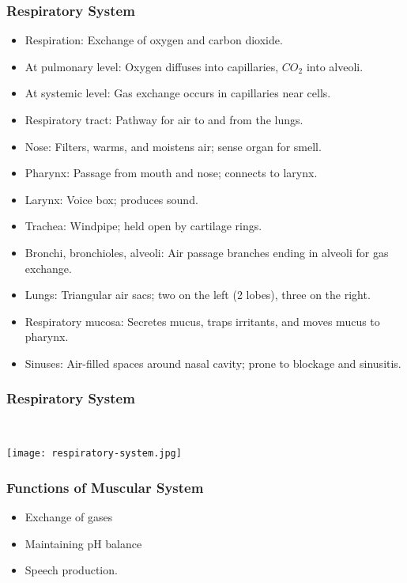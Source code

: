 \begin{frame}[fragile]\frametitle{Respiratory System}

      \begin{itemize}
		\item Respiration: Exchange of oxygen and carbon dioxide.
		\item At pulmonary level: Oxygen diffuses into capillaries, $CO_2$ into alveoli.
		\item At systemic level: Gas exchange occurs in capillaries near cells.
		\item Respiratory tract: Pathway for air to and from the lungs.
		\item Nose: Filters, warms, and moistens air; sense organ for smell.
		\item Pharynx: Passage from mouth and nose; connects to larynx.
		\item Larynx: Voice box; produces sound.
		\item Trachea: Windpipe; held open by cartilage rings.
		\item Bronchi, bronchioles, alveoli: Air passage branches ending in alveoli for gas exchange.
		\item Lungs: Triangular air sacs; two on the left (2 lobes), three on the right.
		\item Respiratory mucosa: Secretes mucus, traps irritants, and moves mucus to pharynx.
		\item Sinuses: Air-filled spaces around nasal cavity; prone to blockage and sinusitis.
	  \end{itemize}

\end{frame}

\begin{frame}[fragile]\frametitle{Respiratory System}
\
		\begin{center}
		\texttt{[image: respiratory-system.jpg]}
		\end{center}	

\end{frame}
\begin{frame}[fragile]\frametitle{Functions of Muscular System }

      \begin{itemize}
		\item Exchange of gases
		\item Maintaining pH balance
		\item Speech production.
	  \end{itemize}

\end{frame}
	
